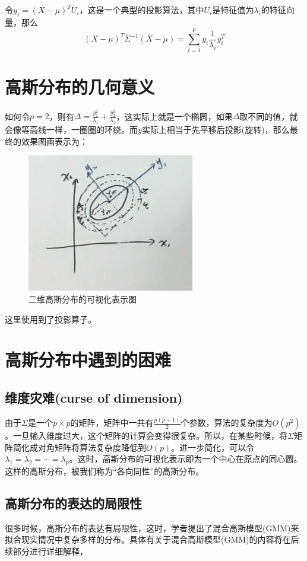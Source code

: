 \documentclass[a4paper]{article}
\begin{document}
令$y_i=(X-\mu)^TU_i$，这是一个典型的投影算法，其中$U_i$是特征值为$\lambda_i$的特征向量，那么
\begin{equation}
    (X-\mu)^T\Sigma^{-1}(X-\mu) = \sum_{i=1}^{p} y_i\frac{1}{\lambda_i} y_i^T
\end{equation}

\section{高斯分布的几何意义}
如何令$p=2$，则有$\Delta = \frac{y_1^2}{\lambda_1} + \frac{y_2^2}{\lambda_2} $，这实际上就是一个椭圆，如果$\Delta$取不同的值，就会像等高线一样，一圈圈的环绕。而$y$实际上相当于先平移后投影(旋转)，那么最终的效果图画表示为：
\begin{figure}[H]
    \centering
    \includegraphics[width=.5\textwidth]{20191019203302.png}
    \caption{二维高斯分布的可视化表示图}
    \label{fig:my_label_1}
\end{figure}

这里使用到了投影算子。

\section{高斯分布中遇到的困难}
\subsection{维度灾难(curse of dimension)}
由于$\Sigma$是一个$p\times p$的矩阵，矩阵中一共有$\frac{p(p+1)}{2}$个参数，算法的复杂度为$O(p^2)$。一旦输入维度过大，这个矩阵的计算会变得很复杂。所以，在某些时候，将$\Sigma$矩阵简化成对角矩阵将算法复杂度降低到$O(p)$。进一步简化，可以令$\lambda_1=\lambda_2=\cdots=\lambda_p$。这时，高斯分布的可视化表示即为一个中心在原点的同心圆。这样的高斯分布，被我们称为“各向同性”的高斯分布。

\subsection{高斯分布的表达的局限性}
很多时候，高斯分布的表达有局限性，这时，学者提出了混合高斯模型(GMM)来拟合现实情况中复杂多样的分布。具体有关于混合高斯模型(GMM)的内容将在后续部分进行详细解释，
\end{document}

